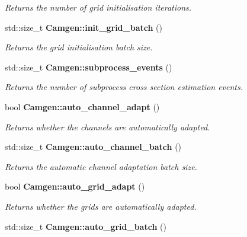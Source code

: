 \begin{DoxyCompactItemize}
\begin{DoxyCompactList}\small\item\em Returns the number of grid initialisation iterations. \end{DoxyCompactList}\item 
\hypertarget{a00849_abc620352fdb254351d0bd992fa6ad8e0}{std\-::size\-\_\-t {\bfseries Camgen\-::init\-\_\-grid\-\_\-batch} ()}\label{a00849_abc620352fdb254351d0bd992fa6ad8e0}

\begin{DoxyCompactList}\small\item\em Returns the grid initialisation batch size. \end{DoxyCompactList}\item 
\hypertarget{a00849_a48a6b3d1e3a94e622d75fc2f4c204630}{std\-::size\-\_\-t {\bfseries Camgen\-::subprocess\-\_\-events} ()}\label{a00849_a48a6b3d1e3a94e622d75fc2f4c204630}

\begin{DoxyCompactList}\small\item\em Returns the number of subprocess cross section estimation events. \end{DoxyCompactList}\item 
\hypertarget{a00849_a040576ccd9f56a46334e4cfd8a5b554e}{bool {\bfseries Camgen\-::auto\-\_\-channel\-\_\-adapt} ()}\label{a00849_a040576ccd9f56a46334e4cfd8a5b554e}

\begin{DoxyCompactList}\small\item\em Returns whether the channels are automatically adapted. \end{DoxyCompactList}\item 
\hypertarget{a00849_af557e259212f3212ab4c60a08625216b}{std\-::size\-\_\-t {\bfseries Camgen\-::auto\-\_\-channel\-\_\-batch} ()}\label{a00849_af557e259212f3212ab4c60a08625216b}

\begin{DoxyCompactList}\small\item\em Returns the automatic channel adaptation batch size. \end{DoxyCompactList}\item 
\hypertarget{a00849_a3c970a0eee330bf5a512083b715fe4b0}{bool {\bfseries Camgen\-::auto\-\_\-grid\-\_\-adapt} ()}\label{a00849_a3c970a0eee330bf5a512083b715fe4b0}

\begin{DoxyCompactList}\small\item\em Returns whether the grids are automatically adapted. \end{DoxyCompactList}\item 
\hypertarget{a00849_a0152cb9afac8cb34a5fb0330472c1344}{std\-::size\-\_\-t {\bfseries Camgen\-::auto\-\_\-grid\-\_\-batch} ()}\label{a00849_a0152cb9afac8cb34a5fb0330472c1344}


\end{DoxyCompactItemize}
